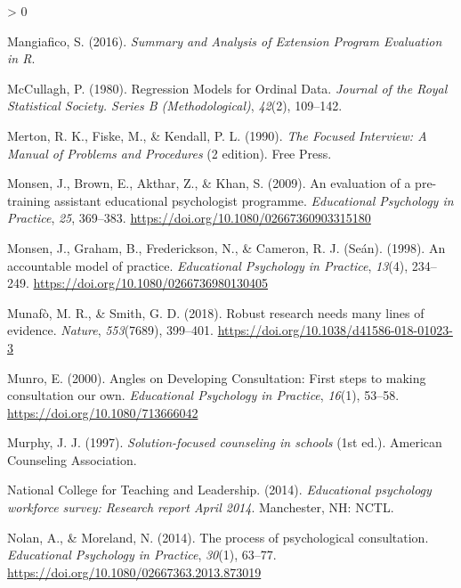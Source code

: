\documentclass[
  english,
  man]{apa}
\newlength{\cslhangindent}
\newenvironment{CSLReferences}[2] %
 {%
  \setlength{\parindent}{0pt}
  \ifodd #1 \everypar{\setlength{\hangindent}{\cslhangindent}}\ignorespaces\fi
  \ifnum #2 > 0
  \setlength{\parskip}{#2\baselineskip}
  \fi
 }%
 {}
\begin{document}
\begin{CSLReferences}{1}{0}
\leavevmode\hypertarget{ref-mangiaficoSummaryAnalysisExtension2016}{}%
Mangiafico, S. (2016). \emph{Summary and {Analysis} of {Extension Program Evaluation} in {R}}.

\leavevmode\hypertarget{ref-mccullaghRegressionModelsOrdinal1980}{}%
McCullagh, P. (1980). Regression {Models} for {Ordinal Data}. \emph{Journal of the Royal Statistical Society. Series B (Methodological)}, \emph{42}(2), 109--142.

\leavevmode\hypertarget{ref-mertonFocusedInterviewManual1990}{}%
Merton, R. K., Fiske, M., \& Kendall, P. L. (1990). \emph{The {Focused Interview}: {A Manual} of {Problems} and {Procedures}} (2 edition). {Free Press}.

\leavevmode\hypertarget{ref-monsenEvaluationPreTraining2009}{}%
Monsen, J., Brown, E., Akthar, Z., \& Khan, S. (2009). An evaluation of a pre-training assistant educational psychologist programme. \emph{Educational Psychology in Practice}, \emph{25}, 369--383. \url{https://doi.org/10.1080/02667360903315180}

\leavevmode\hypertarget{ref-monsenAccountableModelPractice1998}{}%
Monsen, J., Graham, B., Frederickson, N., \& Cameron, R. J. (Seán). (1998). An accountable model of practice. \emph{Educational Psychology in Practice}, \emph{13}(4), 234--249. \url{https://doi.org/10.1080/0266736980130405}

\leavevmode\hypertarget{ref-munafoRobustResearchNeeds2018}{}%
Munafò, M. R., \& Smith, G. D. (2018). Robust research needs many lines of evidence. \emph{Nature}, \emph{553}(7689), 399--401. \url{https://doi.org/10.1038/d41586-018-01023-3}

\leavevmode\hypertarget{ref-munroAnglesDevelopingConsultation2000}{}%
Munro, E. (2000). Angles on {Developing Consultation}: {First} steps to making consultation our own. \emph{Educational Psychology in Practice}, \emph{16}(1), 53--58. \url{https://doi.org/10.1080/713666042}

\leavevmode\hypertarget{ref-murphySolutionfocusedCounselingSchools1997}{}%
Murphy, J. J. (1997). \emph{Solution-focused counseling in schools} (1st ed.). {American Counseling Association}.

\leavevmode\hypertarget{ref-nationalcollegeforteachingandleadershipEducationalPsychologyWorkforce2014}{}%
National College for Teaching and Leadership. (2014). \emph{Educational psychology workforce survey: {Research} report {April} 2014}. {Manchester, NH: NCTL}.

\leavevmode\hypertarget{ref-nolanProcessPsychologicalConsultation2014}{}%
Nolan, A., \& Moreland, N. (2014). The process of psychological consultation. \emph{Educational Psychology in Practice}, \emph{30}(1), 63--77. \url{https://doi.org/10.1080/02667363.2013.873019}


\end{CSLReferences}
\end{document}
